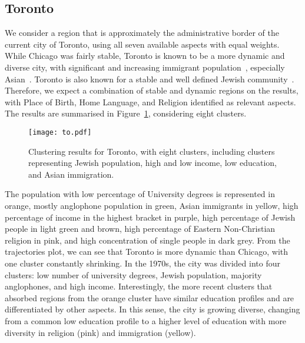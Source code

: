 \subsection{Toronto}

We consider a region that is approximately the administrative border of the
current city of Toronto, using all seven available aspects with equal weights.
While Chicago was fairly stable, Toronto is known to be a more dynamic and
diverse city, with significant and increasing immigrant
population~\citep{hulchanski2007three,Fong2011}, especially
Asian~\citep{Fong2003}. Toronto is also known for a stable and well defined
Jewish community~\citep{Harold2018, Fong2011}. Therefore, we expect a
combination of stable and dynamic regions on the results, with Place of Birth,
Home Language, and Religion identified as relevant aspects. The results are
summarised in Figure~\ref{fig:to}, considering eight clusters.

\begin{figure}
    \centering 
    \texttt{[image: to.pdf]}
    \caption{Clustering results for Toronto, with eight clusters, including
    clusters representing Jewish population, high and low income, low education,
    and Asian immigration.\label{fig:to}}
\end{figure}

The population with low percentage of University degrees is represented in
orange, mostly anglophone population in green, Asian immigrants in yellow, high
percentage of income in the highest bracket in purple, high percentage of Jewish
people in light green and brown, high percentage of Eastern Non-Christian
religion in pink, and high concentration of single people in dark grey. From the
trajectories plot, we can see that Toronto is more dynamic than Chicago, with
one cluster constantly shrinking. In the 1970s, the city was divided into four
clusters: low number of university degrees, Jewish population, majority
anglophones, and high income. Interestingly, the more recent clusters that
absorbed regions from the orange cluster have similar education profiles and are
differentiated by other aspects. In this sense, the city is growing diverse,
changing from a common low education profile to a higher level of education with
more diversity in religion (pink) and immigration (yellow).


